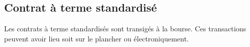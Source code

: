 \documentclass[10pt, french]{article}
\begin{document}
\begin{multicols*}{2}
\columnbreak

\subsection*{Contrat à terme standardisé}

Les contrats à terme standardisés sont transigés à la bourse. Ces transactions peuvent avoir lieu soit sur le plancher ou électroniquement.


\end{multicols*}
\end{document}
